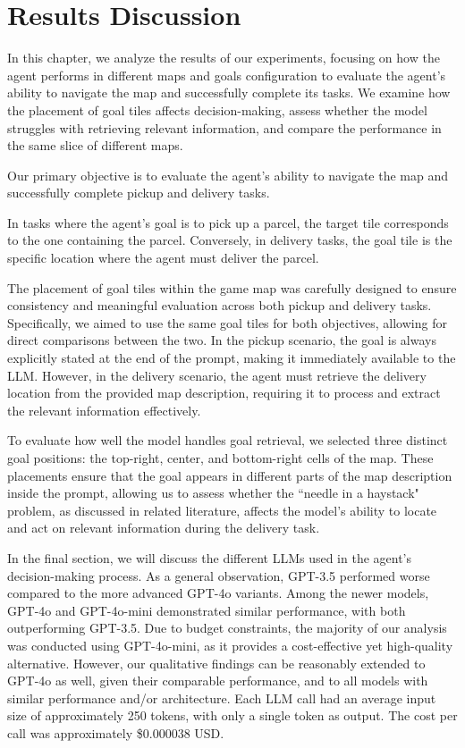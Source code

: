 \chapter{Results Discussion}
\label{cha:results_discussion}

In this chapter, we analyze the results of our experiments, focusing on how the
agent performs in different maps and goals configuration to evaluate the agent's
ability to navigate the map and successfully complete its tasks. We examine how the
placement of goal tiles affects decision-making, assess whether the model
struggles with retrieving relevant information, and compare the performance in the
same slice of different maps.

Our primary objective is to evaluate the agent's ability to navigate the map and
successfully complete pickup and delivery tasks.

In tasks where the agent's goal is to pick up a parcel, the target tile
corresponds to the one containing the parcel. Conversely, in delivery tasks, the
goal tile is the specific location where the agent must deliver the parcel.

The placement of goal tiles within the game map was carefully designed to ensure
consistency and meaningful evaluation across both pickup and delivery tasks.
Specifically, we aimed to use the same goal tiles for both objectives, allowing
for direct comparisons between the two. In the pickup scenario, the goal is
always explicitly stated at the end of the prompt, making it immediately available
to the LLM. However, in the delivery scenario, the agent must retrieve the
delivery location from the provided map description, requiring it to process and
extract the relevant information effectively.

To evaluate how well the model handles goal retrieval, we selected three
distinct goal positions: the top-right, center, and bottom-right cells of the map.
These placements ensure that the goal appears in different parts of the map
description inside the prompt, allowing us to assess whether the ``needle in a haystack"
problem, as discussed in related literature, affects the model's ability to
locate and act on relevant information during the delivery task.

In the final section, we will discuss the different LLMs used in the agent's decision-making
process. As a general observation, GPT-3.5 performed worse compared to the more advanced
GPT-4o variants. Among the newer models, GPT-4o and GPT-4o-mini demonstrated similar
performance, with both outperforming GPT-3.5. Due to budget constraints, the
majority of our analysis was conducted using GPT-4o-mini, as it provides a cost-effective
yet high-quality alternative. However, our qualitative findings can be reasonably
extended to GPT-4o as well, given their comparable performance, and to all models
with similar performance and/or architecture. Each LLM call had an average input
size of approximately 250 tokens, with only a single token as output. The cost
per call was approximately \$0.000038 USD.

